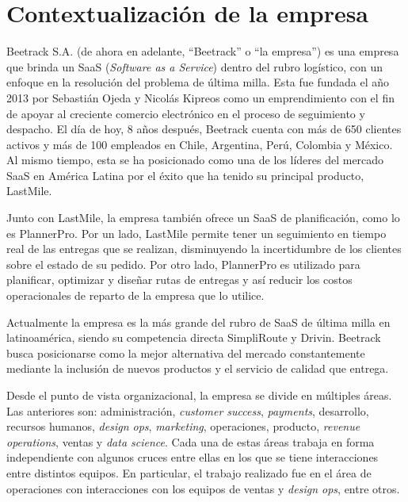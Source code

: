 \section{Contextualización de la empresa}
    
    Beetrack S.A. (de ahora en adelante, ``Beetrack'' o ``la empresa'') es una empresa que brinda un SaaS (\textit{Software as a Service}) dentro del rubro logístico, con un enfoque en la resolución del problema de última milla. Esta fue fundada el año 2013 por Sebastián Ojeda y Nicolás Kipreos como un emprendimiento con el fin de apoyar al creciente comercio electrónico en el proceso de seguimiento y despacho. El día de hoy, 8 años después, Beetrack cuenta con más de 650 clientes activos y más de 100 empleados \cite{corporateit} en Chile, Argentina, Perú, Colombia y México. Al mismo tiempo, esta se ha posicionado como una de los líderes del mercado SaaS en América Latina por el éxito que ha tenido su principal producto, LastMile.

    Junto con LastMile, la empresa también ofrece un SaaS de planificación, como lo es PlannerPro. Por un lado, LastMile permite tener un seguimiento en tiempo real de las entregas que se realizan, disminuyendo la incertidumbre de los clientes sobre el estado de su pedido. Por otro lado, PlannerPro es utilizado para planificar, optimizar y diseñar rutas de entregas y así  reducir los costos operacionales de reparto de la empresa que lo utilice.
    
    Actualmente la empresa es la más grande del rubro de SaaS de última milla en latinoamérica, siendo su competencia directa SimpliRoute y Drivin. Beetrack busca posicionarse como la mejor alternativa del mercado constantemente mediante la inclusión de nuevos productos y el servicio de calidad que entrega.
    
    Desde el punto de vista organizacional, la empresa se divide en múltiples áreas. Las anteriores son: administración, \textit{customer success}, \textit{payments}, desarrollo, recursos humanos, \textit{design ops}, \textit{marketing}, operaciones, producto, \textit{revenue operations}, ventas y \textit{data science}. Cada una de estas áreas trabaja en forma independiente con algunos cruces entre ellas en los que se tiene interacciones entre distintos equipos. En particular, el trabajo realizado fue en el área de operaciones con interacciones con los equipos de ventas y \textit{design ops}, entre otros.

